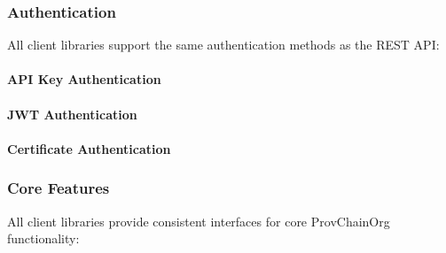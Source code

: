 \documentclass[letterpaper,10pt,english]{sphinxmanual}
\begin{document}
\begin{sphinxVerbatim}[commandchars=\\\{\}]
\end{sphinxVerbatim}


\subsubsection{Authentication}
\label{\detokenize{api/client-libraries:authentication}}
\sphinxAtStartPar
All client libraries support the same authentication methods as the REST API:


\paragraph{API Key Authentication}
\label{\detokenize{api/client-libraries:api-key-authentication}}

\paragraph{JWT Authentication}
\label{\detokenize{api/client-libraries:jwt-authentication}}

\paragraph{Certificate Authentication}
\label{\detokenize{api/client-libraries:certificate-authentication}}

\subsubsection{Core Features}
\label{\detokenize{api/client-libraries:core-features}}
\sphinxAtStartPar
All client libraries provide consistent interfaces for core ProvChainOrg functionality:
\end{document}
